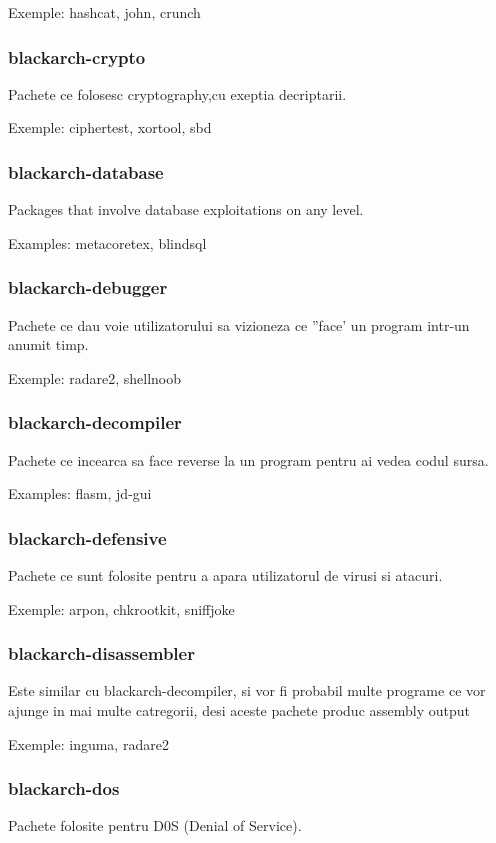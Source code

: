 \documentclass[a4paper, oneside, 11pt]{book}
\begin{document}
Exemple: hashcat, john, crunch

\subsubsection{blackarch-crypto}
Pachete ce folosesc  cryptography,cu exeptia decriptarii.

Exemple: ciphertest, xortool, sbd

\subsubsection{blackarch-database}
Packages that involve database exploitations on any level.

Examples: metacoretex, blindsql

\subsubsection{blackarch-debugger}
Pachete ce dau voie utilizatorului sa vizioneza ce ''face' un program intr-un anumit timp.

Exemple: radare2, shellnoob

\subsubsection{blackarch-decompiler}
Pachete ce incearca sa face  reverse la un program pentru ai vedea codul sursa.

Examples: flasm, jd-gui

\subsubsection{blackarch-defensive}
Pachete ce sunt folosite pentru a apara utilizatorul de virusi si atacuri.

Exemple: arpon, chkrootkit, sniffjoke

\subsubsection{blackarch-disassembler}
Este similar cu blackarch-decompiler, si vor fi probabil multe programe ce vor ajunge in mai multe catregorii, desi aceste pachete produc assembly output

Exemple: inguma, radare2

\subsubsection{blackarch-dos}
Pachete folosite pentru D0S  (Denial of Service).
\end{document}
